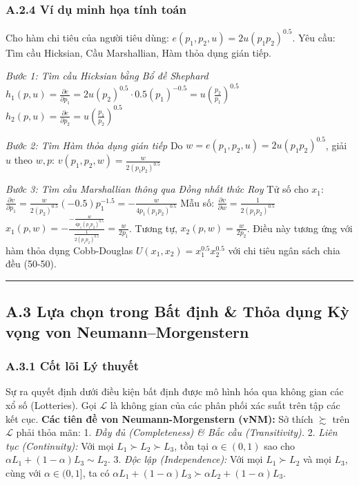\documentclass[
]{article}
\begin{document}
\subsubsection{A.2.4 Ví dụ minh họa tính
toán}\label{a.2.4-vuxed-dux1ee5-minh-hux1ecda-tuxednh-touxe1n}

Cho hàm chi tiêu của người tiêu dùng:
\(e(p_1, p_2, u) = 2 u (p_1 p_2)^{0.5}\). Yêu cầu: Tìm cầu Hicksian, Cầu
Marshallian, Hàm thỏa dụng gián tiếp.

\emph{Bước 1: Tìm cầu Hicksian bằng Bổ đề Shephard}
\(h_1(p, u) = \frac{\partial e}{\partial p_1} = 2 u (p_2)^{0.5} \cdot 0.5 (p_1)^{-0.5} = u \left( \frac{p_2}{p_1} \right)^{0.5}\)
\(h_2(p, u) = \frac{\partial e}{\partial p_2} = u \left( \frac{p_1}{p_2} \right)^{0.5}\)

\emph{Bước 2: Tìm Hàm thỏa dụng gián tiếp} Do
\(w = e(p_1, p_2, u) = 2 u (p_1 p_2)^{0.5}\), giải \(u\) theo \(w, p\):
\(v(p_1, p_2, w) = \frac{w}{2 (p_1 p_2)^{0.5}}\)

\emph{Bước 3: Tìm cầu Marshallian thông qua Đồng nhất thức Roy} Tử số
cho \(x_1\):
\(\frac{\partial v}{\partial p_1} = \frac{w}{2 (p_2)^{0.5}} (-0.5) p_1^{-1.5} = - \frac{w}{4 p_1 (p_1 p_2)^{0.5}}\)
Mẫu số: \(\frac{\partial v}{\partial w} = \frac{1}{2 (p_1 p_2)^{0.5}}\)
\(x_1(p, w) = - \frac{- \frac{w}{4 p_1 (p_1 p_2)^{0.5}}}{\frac{1}{2 (p_1 p_2)^{0.5}}} = \frac{w}{2 p_1}\).
Tương tự, \(x_2(p, w) = \frac{w}{2 p_2}\). Điều này tương ứng với hàm
thỏa dụng Cobb-Douglas \(U(x_1, x_2) = x_1^{0.5} x_2^{0.5}\) với chi
tiêu ngân sách chia đều (50-50).

\begin{center}\rule{0.5\linewidth}{0.5pt}\end{center}

\subsection{A.3 Lựa chọn trong Bất định \& Thỏa dụng Kỳ vọng von
Neumann--Morgenstern}\label{a.3-lux1ef1a-chux1ecdn-trong-bux1ea5t-ux111ux1ecbnh-thux1ecfa-dux1ee5ng-kux1ef3-vux1ecdng-von-neumannmorgenstern}

\subsubsection{A.3.1 Cốt lõi Lý
thuyết}\label{a.3.1-cux1ed1t-luxf5i-luxfd-thuyux1ebft}

Sự ra quyết định dưới điều kiện bất định được mô hình hóa qua không gian
các xổ số (Lotteries). Gọi \(\mathcal{L}\) là không gian của các phân
phối xác suất trên tập các kết cục. \textbf{Các tiên đề von
Neumann-Morgenstern (vNM):} Sở thích \(\succsim\) trên \(\mathcal{L}\)
phải thỏa mãn: 1. \emph{Đầy đủ (Completeness) \& Bắc cầu
(Transitivity).} 2. \emph{Liên tục (Continuity):} Với mọi
\(L_1 \succ L_2 \succ L_3\), tồn tại \(\alpha \in (0, 1)\) sao cho
\(\alpha L_1 + (1-\alpha) L_3 \sim L_2\). 3. \emph{Độc lập
(Independence):} Với mọi \(L_1 \succ L_2\) và mọi \(L_3\), cùng với
\(\alpha \in (0,1]\), ta có
\(\alpha L_1 + (1-\alpha) L_3 \succ \alpha L_2 + (1-\alpha) L_3\).
\end{document}
